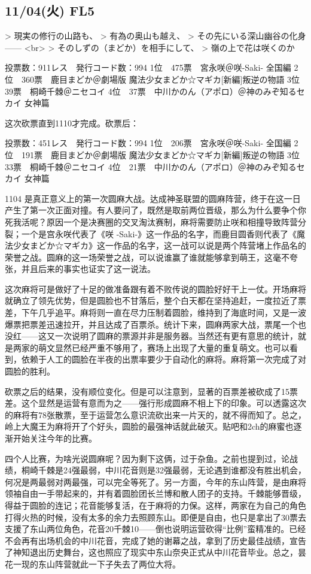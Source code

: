 \subsection{11/04(火) FL5}

> 現実の修行の山路も、
> 有為の奥山も越え、
> その先にいる深山幽谷の化身—— <br>
> そのしずの（まどか）を相手にして、
> 嶺の上で花は咲くのか

    投票数：911レス　発行コード数：994
    1位　475票　宮永咲＠咲-Saki- 全国編
    2位　360票　鹿目まどか＠劇場版 魔法少女まどか☆マギカ[新編]叛逆の物語
    3位　39票　桐崎千棘＠ニセコイ
    4位　37票　中川かのん（アポロ）＠神のみぞ知るセカイ 女神篇

这次砍票直到1110才完成。砍票后：

    投票数：451レス　発行コード数：994
    1位　206票　宮永咲＠咲-Saki- 全国編
    2位　191票　鹿目まどか＠劇場版 魔法少女まどか☆マギカ[新編]叛逆の物語
    3位　33票　桐崎千棘＠ニセコイ
    4位　21票　中川かのん（アポロ）＠神のみぞ知るセカイ 女神篇

1104 是真正意义上的第一次圆麻大战。达成神圣联盟的圆麻阵营，终于在这一日产生了第一次正面对撞。有人要问了，既然是取前两位晋级，那么为什么要争个你死我活呢？原因一个是决赛圈的交叉淘汰赛制，麻将需要防止咲和相撞导致阵营分裂；一个是宫永咲代表了《咲 -Saki-》这一作品的名字，而鹿目圆香则代表了《魔法少女まどか☆マギカ》这一作品的名字，这一战可以说是两个阵营堵上作品名的荣誉之战。圆麻的这一场荣誉之战，可以说谁赢了谁就能够拿到萌王，这毫不夸张，并且后来的事实也证实了这一说法。

这次麻将可是做好了十足的做准备跟有着不败传说的圆脸好好干上一仗。开场麻将就确立了领先优势，但是圆脸也不甘落后，整个白天都在坚持追赶，一度拉近了票差，下午几乎追平。麻将则一直在尽力压制着圆脸，维持到了海底时间，又是一波爆票把票差迅速拉开，并且达成了百票杀。统计下来，圆麻两家大战，票尾一个也没红——这又一次说明了圆麻的票源并非是服务器。当然还有更有意思的统计，就是两家的萌文显然已经严重不够用了，赛场上出现了大量的重复萌文。也可以看到，依赖于人工的圆脸在半夜的出票率要少于自动化的麻将。麻将第一次完成了对圆脸的胜利。

砍票之后的结果，没有顺位变化。但是可以注意到，显著的百票差被砍成了15票差。这个显然是运营有意而为之——强行形成圆麻不相上下的印象。可以透露这次的麻将有78张散票，至于运营怎么意识流砍出来一片天的，就不得而知了。总之，岭上大魔王为麻将开了个好头，圆脸的最强神话就此破灭。贴吧和2ch的麻蜜也逐渐开始关注今年的比赛。

四个人比赛，为啥光说圆麻呢？因为剩下这俩，过于杂鱼。之前也提到过，论战绩，桐崎千棘是24强最弱，中川花音则是32强最弱，无论遇到谁都没有胜出机会，何况是两最弱对两最强，可以完全等死了。另一方面，今年的东山阵营，是由麻将领袖自由一手带起来的，并有着圆脸团长兰博和散人团子的支持。千棘能够晋级，得益于圆脸的连记；花音能够复活，在于麻将的力保。这样，两家在为自己的角色打得火热的时候，没有太多的余力去照顾东山。即便是自由，也只是拿出了30票去支援了东山两位角色，花音20千棘10——倒也说明运营砍得“比例”蛮精准的。已经不会再有出场机会的中川花音，完成了她的谢幕之战，拿到了历史最佳战绩，宣告了神知退出历史舞台，这也照应了现实中东山奈央正式从中川花音毕业。总之，昙花一现的东山阵营就此一下子失去了两位大将。

